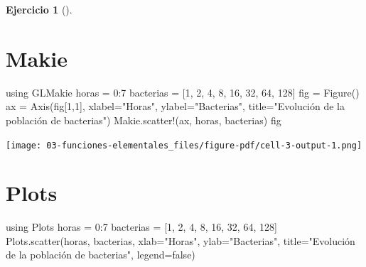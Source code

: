 \documentclass[
  a4paper,
]{scrreport}
\newenvironment{Shaded}{\begin{snugshade}}{\end{snugshade}}
\newcommand{\BuiltInTok}[1]{\textcolor[rgb]{0.00,0.23,0.31}{#1}}
\newcommand{\ConstantTok}[1]{\textcolor[rgb]{0.56,0.35,0.01}{#1}}
\newcommand{\FloatTok}[1]{\textcolor[rgb]{0.68,0.00,0.00}{#1}}
\newcommand{\FunctionTok}[1]{\textcolor[rgb]{0.28,0.35,0.67}{#1}}
\newcommand{\ImportTok}[1]{\textcolor[rgb]{0.00,0.46,0.62}{#1}}
\newcommand{\NormalTok}[1]{\textcolor[rgb]{0.00,0.23,0.31}{#1}}
\newcommand{\OperatorTok}[1]{\textcolor[rgb]{0.37,0.37,0.37}{#1}}
\newcommand{\StringTok}[1]{\textcolor[rgb]{0.13,0.47,0.30}{#1}}
\theoremstyle{definition}
\newtheorem{exercise}{Ejercicio}[chapter]
\theoremstyle{remark}
\begin{document}
\begin{exercise}[]
\begin{enumerate}
\begin{tcolorbox}
  \section{Makie}

\begin{Shaded}
\begin{Highlighting}[]
\ImportTok{using} \BuiltInTok{GLMakie}
\NormalTok{horas }\OperatorTok{=} \FloatTok{0}\OperatorTok{:}\FloatTok{7}
\NormalTok{bacterias }\OperatorTok{=}\NormalTok{ [}\FloatTok{1}\NormalTok{, }\FloatTok{2}\NormalTok{, }\FloatTok{4}\NormalTok{, }\FloatTok{8}\NormalTok{, }\FloatTok{16}\NormalTok{, }\FloatTok{32}\NormalTok{, }\FloatTok{64}\NormalTok{, }\FloatTok{128}\NormalTok{]}
\NormalTok{fig }\OperatorTok{=} \FunctionTok{Figure}\NormalTok{()}
\NormalTok{ax }\OperatorTok{=} \FunctionTok{Axis}\NormalTok{(fig[}\FloatTok{1}\NormalTok{,}\FloatTok{1}\NormalTok{], xlabel}\OperatorTok{=}\StringTok{"Horas"}\NormalTok{, ylabel}\OperatorTok{=}\StringTok{"Bacterias"}\NormalTok{, title}\OperatorTok{=}\StringTok{"Evolución de la población de bacterias"}\NormalTok{)}
\NormalTok{Makie.}\FunctionTok{scatter!}\NormalTok{(ax, horas, bacterias)}
\NormalTok{fig}
\end{Highlighting}
\end{Shaded}

  \texttt{[image: 03-funciones-elementales\_files/figure-pdf/cell-3-output-1.png]}

  \section{Plots}

\begin{Shaded}
\begin{Highlighting}[]
\ImportTok{using} \BuiltInTok{Plots}
\NormalTok{horas }\OperatorTok{=} \FloatTok{0}\OperatorTok{:}\FloatTok{7}
\NormalTok{bacterias }\OperatorTok{=}\NormalTok{ [}\FloatTok{1}\NormalTok{, }\FloatTok{2}\NormalTok{, }\FloatTok{4}\NormalTok{, }\FloatTok{8}\NormalTok{, }\FloatTok{16}\NormalTok{, }\FloatTok{32}\NormalTok{, }\FloatTok{64}\NormalTok{, }\FloatTok{128}\NormalTok{]}
\NormalTok{Plots.}\FunctionTok{scatter}\NormalTok{(horas, bacterias, xlab}\OperatorTok{=}\StringTok{"Horas"}\NormalTok{, ylab}\OperatorTok{=}\StringTok{"Bacterias"}\NormalTok{, title}\OperatorTok{=}\StringTok{"Evolución de la población de bacterias"}\NormalTok{, legend}\OperatorTok{=}\ConstantTok{false}\NormalTok{)}
\end{Highlighting}
\end{Shaded}


\end{tcolorbox}
\end{enumerate}
\end{exercise}
\end{document}
